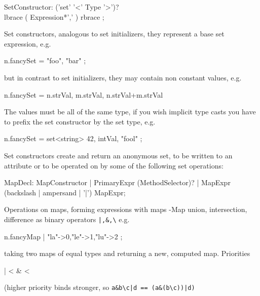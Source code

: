 \begin{rail} 
  SetConstructor: ('set' '<' Type '>')? \\ lbrace ( Expression*',' ) rbrace ;
\end{rail}

Set constructors, analogous to set initializers, they represent a base set expression, e.g. 
\begin{grgenlet}
n.fancySet = { "foo", "bar" };
\end{grgenlet}
but in contrast to set initializers, they may contain non constant values, e.g. 
\begin{grgenlet}
n.fancySet = { n.strVal, m.strVal, n.strVal+m.strVal }
\end{grgenlet}
The values must be all of the same type, if you wish implicit type casts
you have to prefix the set constructor by the set type, e.g.
\begin{grgenlet}
n.fancySet = set<string>{ 42, intVal, "fool" };
\end{grgenlet}
Set constructors create and return an anonymous set,
to be written to an attribute or to be operated on by some of the following set operations:

\begin{rail}
  MapDecl: MapConstructor | PrimaryExpr (MethodSelector)? | MapExpr (backslash | ampersand | '|') MapExpr;
\end{rail}

Operations on maps, forming expressions with maps
-Map union, intersection, difference as binary operators
\verb#|,&,\#
e.g. 
\begin{grgenlet} 
n.fancyMap | { "la"->0,"le"->1,"lu"->2 };
\end{grgenlet}
taking two maps of equal types and returning a new, computed map.
Priorities 
\begin{grgenlet}
| < & < \
\end{grgenlet}
(higher priority binds stronger, so
\verb#a&b\c|d == (a&(b\c))|d)#

